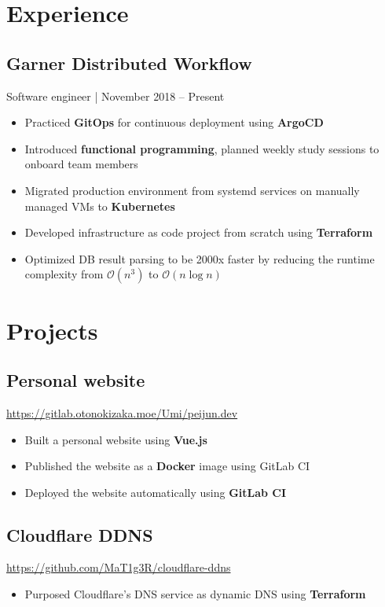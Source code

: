 \documentclass[letterpaper,12pt,oneside]{article}
\newcommand{\smallurl}[1]{\footnotesize{\url{#1}}\normalsize}
\begin{document}
\section*{Experience}
\subsection*{Garner Distributed Workflow}
Software engineer | November 2018 -- Present
\begin{itemize}
      \setlength\itemsep{0em}
      \item Practiced \textbf{GitOps} for continuous deployment using \textbf{ArgoCD}
      \item Introduced \textbf{functional programming}, planned weekly study sessions to onboard team members
      \item Migrated production environment from systemd services on manually managed VMs to \textbf{Kubernetes}
      \item Developed infrastructure as code project from scratch using \textbf{Terraform}
      \item Optimized DB result parsing to be 2000x faster by reducing the runtime complexity from $\mathcal{O}(n^3)$ to $\mathcal{O}(n\log{}n)$
\end{itemize}

\section*{Projects}

\subsection*{Personal website \hfill {}}
\smallurl{https://gitlab.otonokizaka.moe/Umi/peijun.dev}
\begin{itemize}
      \setlength\itemsep{0em}
      \item Built a personal website using \textbf{Vue.js}
      \item Published the website as a \textbf{Docker} image using GitLab CI
      \item Deployed the website automatically using \textbf{GitLab CI}
\end{itemize}

\subsection*{Cloudflare DDNS \hfill {}}
\smallurl{https://github.com/MaT1g3R/cloudflare-ddns}
\begin{itemize}
      \setlength\itemsep{0em}
      \item Purposed Cloudflare's DNS service as dynamic DNS using \textbf{Terraform}
\end{itemize}
\end{document}
